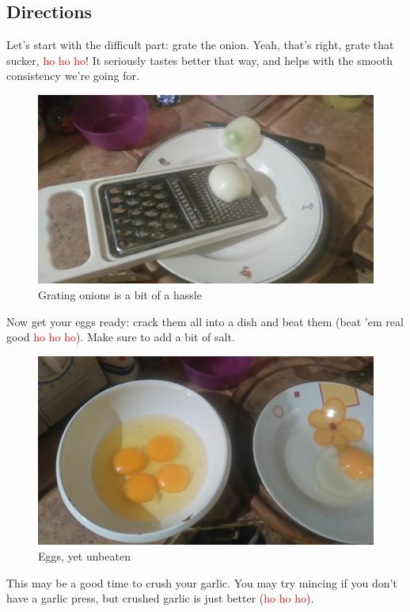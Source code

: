 \documentclass{article}
\begin{document}
\subsection{Directions}
Let's start with the difficult part: grate the onion. Yeah, that's right, grate that sucker, \textcolor{red}{ho ho ho}! It seriously tastes better that way, and helps with the smooth consistency we're going for.

\begin{figure}[!htbp]
\includegraphics[width=\textwidth]{meatloaf_01}
\caption{Grating onions is a bit of a hassle}
\end{figure}

Now get your eggs ready: crack them all into a dish and beat them (beat 'em real good \textcolor{red}{ho ho ho}). Make sure to add a bit of salt.

\begin{figure}[!htbp]
\includegraphics[width=\textwidth]{meatloaf_03}
\caption{Eggs, yet unbeaten}
\end{figure}

This may be a good time to crush your garlic. You may try mincing if you don't have a garlic press, but crushed garlic is just better (\textcolor{red}{ho ho ho}).
\end{document}
